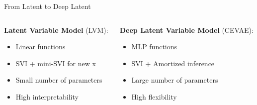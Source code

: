 \documentclass[10pt]{beamer}
\begin{document}
 \begin{frame}{From Latent to Deep Latent}
  \begin{columns}
    \begin{column}{0.5\textwidth}
      \textbf{Latent Variable Model} (LVM):
      \begin{itemize}
        \item Linear functions
        \item SVI + mini-SVI for new x
        \item Small number of parameters
        \item High interpretability
      \end{itemize}
    \end{column}
    \begin{column}{0.5\textwidth}
      \textbf{Deep Latent Variable Model} (CEVAE):
      \begin{itemize}
        \item MLP functions
        \item SVI + Amortized inference
        \item Large number of parameters
        \item High flexibility
      \end{itemize}
    \end{column}
  \end{columns}
  \vspace{1cm}
\end{frame}
\end{document}
